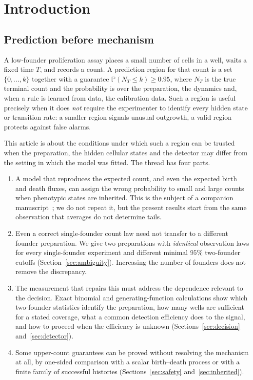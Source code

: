 \documentclass[11pt,a4paper]{article}
\theoremstyle{plain}
\theoremstyle{definition}
\theoremstyle{remark}
\newcommand{\PP}{\mathbb P}
\begin{document}
\section{Introduction}\label{sec:intro}

\subsection{Prediction before mechanism}
A low-founder proliferation assay places a small number of cells in a well, waits a fixed time $T$, and records a count. A prediction region for that count is a set $\{0,\dots,k\}$ together with a guarantee $\PP(N_T\le k)\ge 0.95$, where $N_T$ is the true terminal count and the probability is over the preparation, the dynamics and, when a rule is learned from data, the calibration data. Such a region is useful precisely when it does \emph{not} require the experimenter to identify every hidden state or transition rate: a smaller region signals unusual outgrowth, a valid region protects against false alarms.

This article is about the conditions under which such a region can be trusted when the preparation, the hidden cellular states and the detector may differ from the setting in which the model was fitted. The thread has four parts.
\begin{enumerate}[label=(\roman*)]
\item A model that reproduces the expected count, and even the expected birth and death fluxes, can assign the wrong probability to small and large counts when phenotypic states are inherited. This is the subject of a companion manuscript~\citep{companion2026}; we do not repeat it, but the present results start from the same observation that averages do not determine tails.
\item Even a correct single-founder count law need not transfer to a different founder preparation. We give two preparations with \emph{identical} observation laws for every single-founder experiment and different minimal $95\%$ two-founder cutoffs (Section~\ref{sec:ambiguity}). Increasing the number of founders does not remove the discrepancy.
\item The measurement that repairs this must address the dependence relevant to the decision. Exact binomial and generating-function calculations show which two-founder statistics identify the preparation, how many wells are sufficient for a stated coverage, what a common detection efficiency does to the signal, and how to proceed when the efficiency is unknown (Sections~\ref{sec:decision} and~\ref{sec:detector}).
\item Some upper-count guarantees can be proved without resolving the mechanism at all, by one-sided comparison with a scalar birth--death process or with a finite family of successful histories (Sections~\ref{sec:safety} and~\ref{sec:inherited}).
\end{enumerate}
\end{document}
